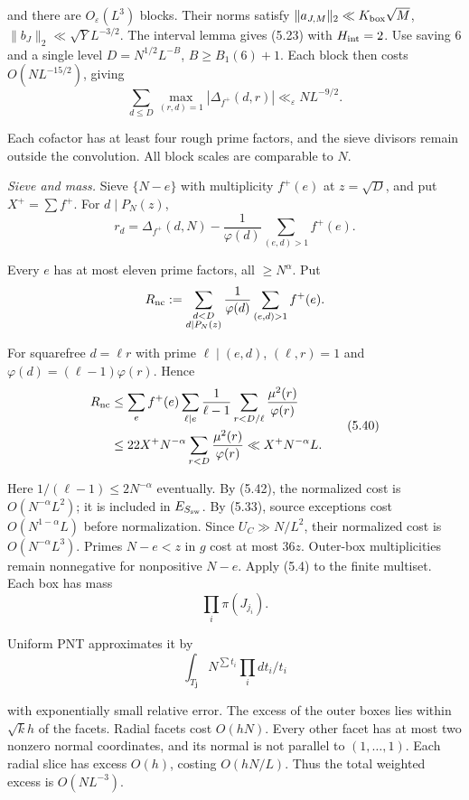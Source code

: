 and there are $O_\varepsilon(L^3)$ blocks.
Their norms satisfy
$\|a_{J,M}\|_2\ll K_{\rm box}\sqrt M$,
$\|b_J\|_2\ll\sqrt YL^{-3/2}$.
The interval lemma gives (5.23) with $H_{\rm int}=2$.
Use saving 6 and a single level $D=N^{1/2}L^{-B}$,
$B\ge B_1(6)+1$.
Each block then costs $O(NL^{-15/2})$, giving
\[
 \sum_{d\le D}\max_{(r,d)=1}|\Delta_{f^+}(d,r)|
 \ll_\varepsilon NL^{-9/2}.
\tag{5.38}
\]

Each cofactor has at least four rough prime factors,
and the sieve divisors remain outside the convolution.
All block scales are comparable to $N$.

\emph{Sieve and mass.}
Sieve $\{N-e\}$ with multiplicity $f^+(e)$ at $z=\sqrt D$,
and put $X^+=\sum f^+$.
For $d\mid P_N(z)$,
\[
 r_d=\Delta_{f^+}(d,N)-\frac1{\varphi(d)}\sum_{(e,d)>1}f^+(e).
\tag{5.39}
\]

Every $e$ has at most eleven prime factors, all $\ge N^\alpha$.
Put
\[
 R_{\rm nc}:=\sum_{\substack{d<D\\d\mid P_N(z)}}
 \frac1{\varphi(d)}\sum_{(e,d)>1}f^+(e).
\]

For squarefree $d=\ell r$ with prime $\ell\mid(e,d)$,
$(\ell,r)=1$ and $\varphi(d)=(\ell-1)\varphi(r)$.
Hence
\[
 \begin{aligned}
 R_{\rm nc}
 &\le\sum_e f^+(e)\sum_{\ell\mid e}\frac1{\ell-1}
       \sum_{r<D/\ell}\frac{\mu^2(r)}{\varphi(r)}\\
 &\le22X^+N^{-\alpha}\sum_{r<D}\frac{\mu^2(r)}{\varphi(r)}
 \ll X^+N^{-\alpha}L.
 \end{aligned}
\tag{5.40}
\]

Here $1/(\ell-1)\le2N^{-\alpha}$ eventually.
By (5.42), the normalized cost is $O(N^{-\alpha}L^2)$;
it is included in $E_{S_{\rm sw}}$.
By (5.33), source exceptions cost $O(N^{1-\alpha}L)$ before normalization.
Since $U_C\gg N/L^2$, their normalized cost is $O(N^{-\alpha}L^3)$.
Primes $N-e<z$ in $g$ cost at most $36z$.
Outer-box multiplicities remain nonnegative for nonpositive $N-e$.
Apply (5.4) to the finite multiset.
Each box has mass
\[
\prod_i\pi(J_{j_i}).
\]

Uniform PNT approximates it by
\[
\int_{T_{\mathbf j}}N^{\sum t_i}\prod_i dt_i/t_i
\]

with exponentially small relative error.
The excess of the outer boxes lies within $\sqrt k h$ of the facets.
Radial facets cost $O(hN)$.
Every other facet has at most two nonzero normal coordinates,
and its normal is not parallel to $(1,\ldots,1)$.
Each radial slice has excess $O(h)$, costing $O(hN/L)$.
Thus the total weighted excess is $O(NL^{-3})$.

